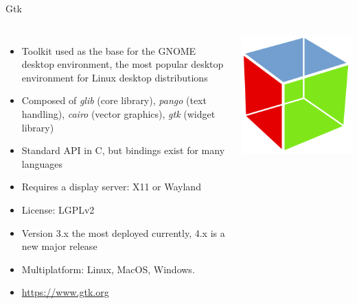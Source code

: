 \begin{frame}{Gtk}
  \begin{columns}
    \begin{itemize}
    \item Toolkit used as the base for the GNOME desktop environment,
      the most popular desktop environment for Linux desktop
      distributions
    \item Composed of {\em glib} (core library), {\em pango} (text
      handling), {\em cairo} (vector graphics), {\em gtk} (widget
      library)
    \item Standard API in C, but bindings exist for many languages
    \item Requires a display server: X11 or Wayland
    \item License: LGPLv2
    \item Version 3.x the most deployed currently, 4.x is a new major
      release
    \item Multiplatform: Linux, MacOS, Windows.
    \item \url{https://www.gtk.org}
    \end{itemize}
    \includegraphics[width=\textwidth]{slides/sysdev-software-stacks/gtk-logo.png}
  \end{columns}
\end{frame}


